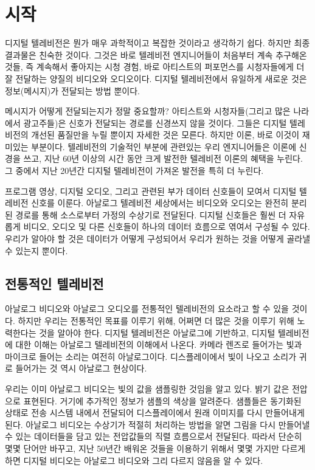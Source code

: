 \chapter{시작}
디지털 텔레비전은 뭔가 매우 과학적이고 복잡한 것이라고 생각하기 쉽다. 하지만 최종 결과물은 친숙한 것이다.
그것은 바로 텔레비전 엔지니어들이 처음부터 계속 추구해온 것들, 즉 계속해서 좋아지는 시청 경험, 바로 아티스트의 퍼포먼스를 시청자들에게 더 잘 전달하는 양질의 비디오와 오디오이다.
디지털 텔레비전에서 유일하게 새로운 것은 정보(메시지)가 전달되는 방법 뿐이다.


메시지가 어떻게 전달되는지가 정말 중요할까? 아티스트와 시청자들(그리고 많은 나라에서 광고주들)은 신호가 전달되는 경로를 신경쓰지 않을 것이다.
그들은 디지털 텔레비전의 개선된 품질만을 누릴 뿐이지 자세한 것은 모른다. 하지만 이론, 바로 이것이 재미있는 부분이다.
텔레비전의 기술적인 부분에 관련있는 우리 엔지니어들은 이론에 신경을 쓰고, 지난 60년 이상의 시간 동안 크게 발전한 텔레비전 이론의 혜택을 누린다.
그 중에서 지난 20년간 디지털 텔레비전이 가져온 발전을 특히 더 누린다.


프로그램 영상, 디지털 오디오, 그리고 관련된 부가 데이터 신호들이 모여서 디지털 텔레비전 신호를 이룬다.
아날로그 텔레비전 세상에서는 비디오와 오디오는 완전히 분리된 경로를 통해 소스로부터 가정의 수상기로 전달된다.
디지털 신호들은 훨씬 더 자유롭게 비디오, 오디오 및 다른 신호들이 하나의 데이터 흐름으로 엮여서 구성될 수 있다.
우리가 알아야 할 것은 데이터가 어떻게 구성되어서 우리가 원하는 것을 어떻게 골라낼 수 있는지 뿐이다.

\section{전통적인 텔레비전}
아날로그 비디오와 아날로그 오디오를 전통적인 텔레비전의 요소라고 할 수 있을 것이다. 하지만 우리는 전통적인 목표를 이루기 위해, 어쩌면 더 많은 것을 이루기 위해 노력한다는 것을 알아야 한다.
디지털 텔레비전은 아날로그에 기반하고, 디지털 텔레비전에 대한 이해는 아날로그 텔레비전의 이해에서 나온다.
카메라 렌즈로 들어가는 빛과 마이크로 들어는 소리는 여전히 아날로그이다. 디스플레이에서 빛이 나오고 소리가 귀로 들어가는 것 역시 아날로그 현상이다.


우리는 이미 아날로그 비디오는 빛의 값을 샘플링한 것임을 알고 있다. 밝기 값은 전압으로 표현된다. 거기에 추가적인 정보가 샘플의 색상을 알려준다.
샘플들은 동기화된 상태로 전송 시스템 내에서 전달되어 디스플레이에서 원래 이미지를 다시 만들어내게 된다.
아날로그 비디오는 수상기가 적절히 처리하는 방법을 알면 그림을 다시 만들어낼 수 있는 데이터들을 담고 있는 전압값들의 직렬 흐름으로서 전달된다.
따라서 단순히 몇몇 단어만 바꾸고, 지난 50년간 배워온 것들을 이용하기 위해서 몇몇 가지만 다르게 하면 디지털 비디오는 아날로그 비디오와 그리 다르지 않음을 알 수 있다.


